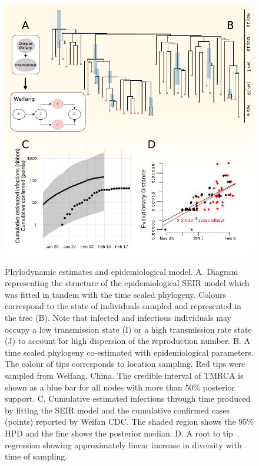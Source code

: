 \documentclass[9pt,lineno,onehalfspacing]{elife}
\begin{document}
\begin{figure}
\begin{fullwidth}
\includegraphics[width=.9\linewidth]{fig1_2.pdf}
\caption{ Phylodynamic estimates and epidemiological model. A. Diagram representing the structure of the epidemiological SEIR model which was fitted in tandem with the time scaled phylogeny. Colours correspond to the state of individuals sampled and represented in the tree (B). Note that infected and infectious individuals may occupy a low transmission state (I) or a high transmission rate state (J) to account for high dispersion of the reproduction number. B. A time scaled phylogeny co-estimated with epidemiological parameters. The colour of tips corresponds to location sampling. Red tips were sampled from Weifang, China. The credible interval of TMRCA is shown as a blue bar for all nodes with more than 50\% posterior support. C. Cumulative estimated infections through time produced by fitting the SEIR model and the cumulative confirmed cases (points) reported by Weifan CDC. The shaded region shows the 95\% HPD and the line shows the posterior median. D. A root to tip regression showing approximately linear increase in diversity with time of sampling. 
}
\label{fig:fig1}
\label{figsupp:treedater}

\end{fullwidth}
\end{figure}
\end{document}
